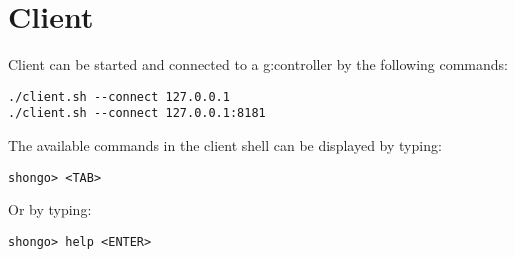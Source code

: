 \section{Client}
Client can be started and connected to a \gls{g:controller} by the following commands:
\begin{verbatim}
./client.sh --connect 127.0.0.1
./client.sh --connect 127.0.0.1:8181
\end{verbatim}
The available commands in the client shell can be displayed by typing:
\begin{verbatim}
shongo> <TAB>
\end{verbatim}
Or by typing:
\begin{verbatim}
shongo> help <ENTER>
\end{verbatim}


